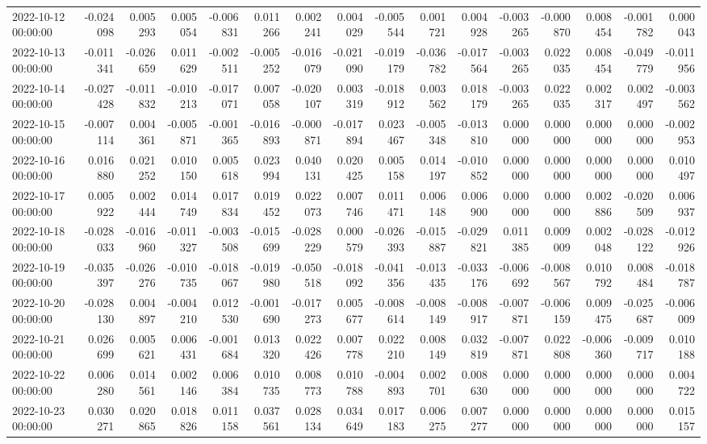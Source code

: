 \begin{tabular}{lrrrrrrrrrrrrrrr}
2022-10-12 00:00:00 & -0.024098 & 0.005293 & 0.005054 & -0.006831 & 0.011266 & 0.002241 & 0.004029 & -0.005544 & 0.001721 & 0.004928 & -0.003265 & -0.000870 & 0.008454 & -0.001782 & 0.000043 \\
2022-10-13 00:00:00 & -0.011341 & -0.026659 & 0.011629 & -0.002511 & -0.005252 & -0.016079 & -0.021090 & -0.019179 & -0.036782 & -0.017564 & -0.003265 & 0.022035 & 0.008454 & -0.049779 & -0.011956 \\
2022-10-14 00:00:00 & -0.027428 & -0.011832 & -0.010213 & -0.017071 & 0.007058 & -0.020107 & 0.003319 & -0.018912 & 0.003562 & 0.018179 & -0.003265 & 0.022035 & 0.002317 & 0.002497 & -0.003562 \\
2022-10-15 00:00:00 & -0.007114 & 0.004361 & -0.005871 & -0.001365 & -0.016893 & -0.000871 & -0.017894 & 0.023467 & -0.005348 & -0.013810 & 0.000000 & 0.000000 & 0.000000 & 0.000000 & -0.002953 \\
2022-10-16 00:00:00 & 0.016880 & 0.021252 & 0.010150 & 0.005618 & 0.023994 & 0.040131 & 0.020425 & 0.005158 & 0.014197 & -0.010852 & 0.000000 & 0.000000 & 0.000000 & 0.000000 & 0.010497 \\
2022-10-17 00:00:00 & 0.005922 & 0.002444 & 0.014749 & 0.017834 & 0.019452 & 0.022073 & 0.007746 & 0.011471 & 0.006148 & 0.006900 & 0.000000 & 0.000000 & 0.002886 & -0.020509 & 0.006937 \\
2022-10-18 00:00:00 & -0.028033 & -0.016960 & -0.011327 & -0.003508 & -0.015699 & -0.028229 & 0.000579 & -0.026393 & -0.015887 & -0.029821 & 0.011385 & 0.009009 & 0.002048 & -0.028122 & -0.012926 \\
2022-10-19 00:00:00 & -0.035397 & -0.026276 & -0.010735 & -0.018067 & -0.019980 & -0.050518 & -0.018092 & -0.041356 & -0.013435 & -0.033176 & -0.006692 & -0.008567 & 0.010792 & 0.008484 & -0.018787 \\
2022-10-20 00:00:00 & -0.028130 & 0.004897 & -0.004210 & 0.012530 & -0.001690 & -0.017273 & 0.005677 & -0.008614 & -0.008149 & -0.008917 & -0.007871 & -0.006159 & 0.009475 & -0.025687 & -0.006009 \\
2022-10-21 00:00:00 & 0.026699 & 0.005621 & 0.006431 & -0.001684 & 0.013320 & 0.022426 & 0.007778 & 0.022210 & 0.008149 & 0.032819 & -0.007871 & 0.022808 & -0.006360 & -0.009717 & 0.010188 \\
2022-10-22 00:00:00 & 0.006280 & 0.014561 & 0.002146 & 0.006384 & 0.010735 & 0.008773 & 0.010788 & -0.004893 & 0.002701 & 0.008630 & 0.000000 & 0.000000 & 0.000000 & 0.000000 & 0.004722 \\
2022-10-23 00:00:00 & 0.030271 & 0.020865 & 0.018826 & 0.011158 & 0.037561 & 0.028134 & 0.034649 & 0.017183 & 0.006275 & 0.007277 & 0.000000 & 0.000000 & 0.000000 & 0.000000 & 0.015157 \\

\end{tabular}
